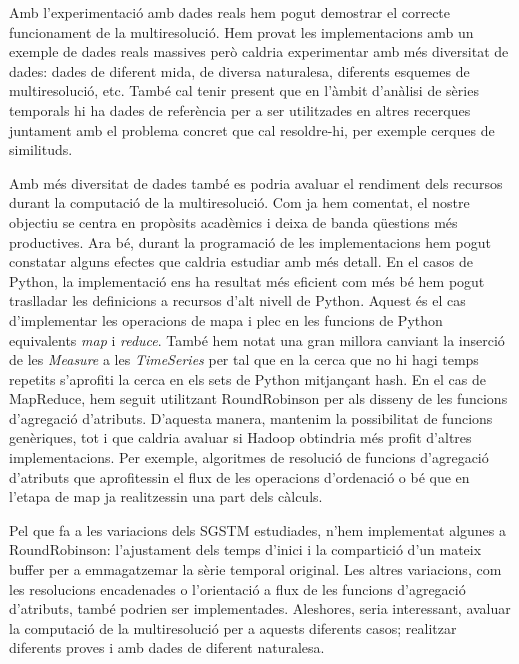 
Amb l'experimentació amb dades reals hem pogut demostrar el correcte
funcionament de la multiresolució.  Hem provat les implementacions amb
un exemple de dades reals massives però caldria experimentar amb més
diversitat de dades: dades de diferent mida, de diversa naturalesa,
diferents esquemes de multiresolució, etc. També cal tenir present que
en l'àmbit d'anàlisi de sèries temporals hi ha dades de
referència \parencite{keogh02} per a ser utilitzades en altres
recerques juntament amb el problema concret que cal resoldre-hi, per
exemple cerques de similituds.


Amb més diversitat de dades també es podria avaluar el rendiment dels
recursos durant la computació de la multiresolució. Com ja hem
comentat, el nostre objectiu se centra en propòsits acadèmics i deixa
de banda qüestions més productives. Ara bé, durant la programació de
les implementacions hem pogut constatar alguns efectes que caldria
estudiar amb més detall.  En el casos de Python, la implementació ens
ha resultat més eficient com més bé hem pogut traslladar les
definicions a recursos d'alt nivell de Python. Aquest és el cas
d'implementar les operacions de mapa i plec en les funcions de Python
equivalents \emph{map} i \emph{reduce}. També hem notat una gran
millora canviant la inserció de les \emph{Measure} a les
\emph{TimeSeries} per tal que en la cerca que no hi hagi temps
repetits s'aprofiti la cerca en els sets de Python mitjançant
hash. %
En el cas de MapReduce, hem seguit utilitzant RoundRobinson per als
disseny de les funcions d'agregació d'atributs. D'aquesta manera,
mantenim la possibilitat de funcions genèriques, tot i que caldria
avaluar si Hadoop obtindria més profit d'altres implementacions. Per
exemple, algoritmes de resolució de funcions d'agregació d'atributs
que aprofitessin el flux de les operacions d'ordenació o bé que en
l'etapa de map ja realitzessin una part dels càlculs.




Pel que fa a les variacions dels \gls{SGSTM} estudiades, n'hem
implementat algunes a RoundRobinson: l'ajustament dels temps d'inici i
la compartició d'un mateix buffer per a emmagatzemar la sèrie temporal
original. Les altres variacions, com les resolucions encadenades o
l'orientació a flux de les funcions d'agregació d'atributs, també
podrien ser implementades. Aleshores, seria interessant, avaluar la
computació de la multiresolució per a aquests diferents casos;
realitzar diferents proves i amb dades de diferent naturalesa. 

